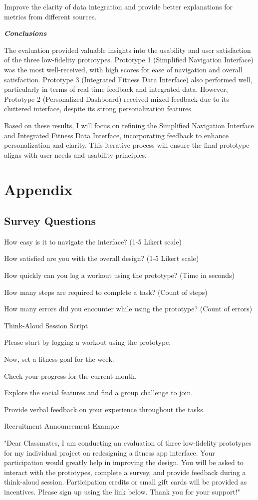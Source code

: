 \documentclass[
	letterpaper, %
]{jdf}
\begin{document}
Improve the clarity of data integration and provide better explanations for metrics from different sources.

\textbf{\textit{Conclusions}}

The evaluation provided valuable insights into the usability and user satisfaction of the three low-fidelity prototypes. Prototype 1 (Simplified Navigation Interface) was the most well-received, with high scores for ease of navigation and overall satisfaction. Prototype 3 (Integrated Fitness Data Interface) also performed well, particularly in terms of real-time feedback and integrated data. However, Prototype 2 (Personalized Dashboard) received mixed feedback due to its cluttered interface, despite its strong personalization features.

Based on these results, I will focus on refining the Simplified Navigation Interface and Integrated Fitness Data Interface, incorporating feedback to enhance personalization and clarity. This iterative process will ensure the final prototype aligns with user needs and usability principles.
\newpage

\section{Appendix}
\subsection{Survey Questions}

How easy is it to navigate the interface? (1-5 Likert scale)

How satisfied are you with the overall design? (1-5 Likert scale)

How quickly can you log a workout using the prototype? (Time in seconds)

How many steps are required to complete a task? (Count of steps)

How many errors did you encounter while using the prototype? (Count of errors)

Think-Aloud Session Script

Please start by logging a workout using the prototype.

Now, set a fitness goal for the week.

Check your progress for the current month.

Explore the social features and find a group challenge to join.

Provide verbal feedback on your experience throughout the tasks.

Recruitment Announcement Example

"Dear Classmates, I am conducting an evaluation of three low-fidelity prototypes for my individual project on redesigning a fitness app interface. Your participation would greatly help in improving the design. You will be asked to interact with the prototypes, complete a survey, and provide feedback during a think-aloud session. Participation credits or small gift cards will be provided as incentives. Please sign up using the link below. Thank you for your support!"
\end{document}
